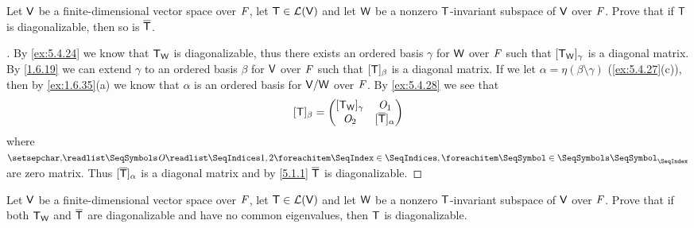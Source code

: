 \begin{ex}\label{ex:5.4.29}
  Let \(\mathsf{V}\) be a finite-dimensional vector space over \(\mathit{F}\), let \(\mathsf{T} \in \mathcal{L}(\mathsf{V})\) and let \(\mathsf{W}\) be a nonzero \(\mathsf{T}\)-invariant subspace of \(\mathsf{V}\) over \(\mathit{F}\).
  Prove that if \(\mathsf{T}\) is diagonalizable, then so is \(\overline{\mathsf{T}}\).
\end{ex}

\begin{proof}[]
  By \cref{ex:5.4.24} we know that \(\mathsf{T}_{\mathsf{W}}\) is diagonalizable, thus there exists an ordered basis \(\gamma\) for \(\mathsf{W}\) over \(\mathit{F}\) such that \([\mathsf{T}_{\mathsf{W}}]_{\gamma}\) is a diagonal matrix.
  By \cref{1.6.19} we can extend \(\gamma\) to an ordered basis \(\beta\) for \(\mathsf{V}\) over \(\mathit{F}\) such that \([\mathsf{T}]_{\beta}\) is a diagonal matrix.
  If we let \(\alpha = \eta(\beta \setminus \gamma)\) (\cref{ex:5.4.27}(c)), then by \cref{ex:1.6.35}(a) we know that \(\alpha\) is an ordered basis for \(\mathsf{V} / \mathsf{W}\) over \(\mathit{F}\).
  By \cref{ex:5.4.28} we see that
  \[
    [\mathsf{T}]_{\beta} = \begin{pmatrix}
      [\mathsf{T}_{\mathsf{W}}]_{\gamma} & \mathit{O}_1                    \\
      \mathit{O}_2              & [\overline{\mathsf{T}}]_{\alpha}
    \end{pmatrix}
  \]
  where \(\seq{\zm}{1,2}\) are zero matrix.
  Thus \([\overline{\mathsf{T}}]_{\alpha}\) is a diagonal matrix and by \cref{5.1.1} \(\overline{\mathsf{T}}\) is diagonalizable.
\end{proof}

\begin{ex}\label{ex:5.4.30}
  Let \(\mathsf{V}\) be a finite-dimensional vector space over \(\mathit{F}\), let \(\mathsf{T} \in \mathcal{L}(\mathsf{V})\) and let \(\mathsf{W}\) be a nonzero \(\mathsf{T}\)-invariant subspace of \(\mathsf{V}\) over \(\mathit{F}\).
  Prove that if both \(\mathsf{T}_{\mathsf{W}}\) and \(\overline{\mathsf{T}}\) are diagonalizable and have no common eigenvalues, then \(\mathsf{T}\) is diagonalizable.
\end{ex}


